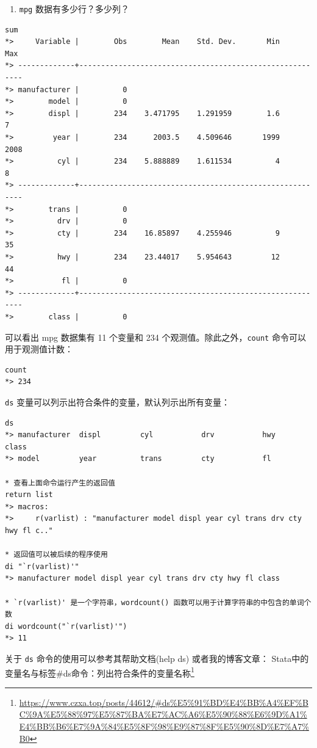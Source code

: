 \documentclass[]{ctexbook}
\providecommand{\tightlist}{%
  \setlength{\itemsep}{0pt}\setlength{\parskip}{0pt}}
\renewcommand{\href}[2]{#2\footnote{\url{#1}}}
\begin{document}
\begin{enumerate}
\def\labelenumi{\arabic{enumi}.}
\setcounter{enumi}{1}
\tightlist
\item
  \texttt{mpg} 数据有多少行？多少列？
\end{enumerate}

\begin{lstlisting}
sum
*>     Variable |        Obs        Mean    Std. Dev.       Min        Max
*> -------------+---------------------------------------------------------
*> manufacturer |          0
*>        model |          0
*>        displ |        234    3.471795    1.291959        1.6          7
*>         year |        234      2003.5    4.509646       1999       2008
*>          cyl |        234    5.888889    1.611534          4          8
*> -------------+---------------------------------------------------------
*>        trans |          0
*>          drv |          0
*>          cty |        234    16.85897    4.255946          9         35
*>          hwy |        234    23.44017    5.954643         12         44
*>           fl |          0
*> -------------+---------------------------------------------------------
*>        class |          0
\end{lstlisting}

可以看出 mpg 数据集有 11 个变量和 234 个观测值。除此之外，\texttt{count} 命令可以用于观测值计数：

\begin{lstlisting}
count
*> 234
\end{lstlisting}

\texttt{ds} 变量可以列示出符合条件的变量，默认列示出所有变量：

\begin{lstlisting}
ds
*> manufacturer  displ         cyl           drv           hwy           class
*> model         year          trans         cty           fl

* 查看上面命令运行产生的返回值
return list
*> macros:
*>     r(varlist) : "manufacturer model displ year cyl trans drv cty hwy fl c.."

* 返回值可以被后续的程序使用
di "`r(varlist)'"
*> manufacturer model displ year cyl trans drv cty hwy fl class

* `r(varlist)' 是一个字符串，wordcount() 函数可以用于计算字符串的中包含的单词个数
di wordcount("`r(varlist)'")
*> 11
\end{lstlisting}

关于 \texttt{ds} 命令的使用可以参考其帮助文档(help ds) 或者我的博客文章： \href{https://www.czxa.top/posts/44612/\#ds\%E5\%91\%BD\%E4\%BB\%A4\%EF\%BC\%9A\%E5\%88\%97\%E5\%87\%BA\%E7\%AC\%A6\%E5\%90\%88\%E6\%9D\%A1\%E4\%BB\%B6\%E7\%9A\%84\%E5\%8F\%98\%E9\%87\%8F\%E5\%90\%8D\%E7\%A7\%B0}{Stata中的变量名与标签\#ds命令：列出符合条件的变量名称}
\end{document}
